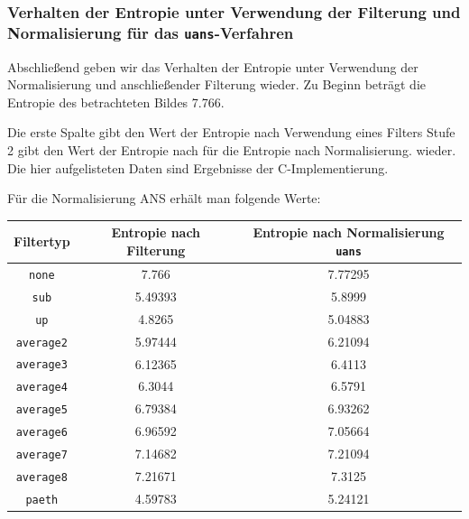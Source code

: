 \documentclass[a4paper,12pt]{article}
\newcommand{\CC}{C\nolinebreak\hspace{-.05em}\raisebox{.4ex}{\tiny\bf+}\nolinebreak\hspace{-.10em}\raisebox{.4ex}{\tiny\bf+}\;}
\begin{document}
\subsubsection{Verhalten der Entropie unter Verwendung der Filterung und Normalisierung für das {\tt{uans}}-Verfahren}
Abschließend geben wir das Verhalten der Entropie unter Verwendung der Normalisierung und anschließender Filterung wieder. Zu Beginn beträgt die Entropie des betrachteten Bildes 7.766.


 Die erste Spalte gibt den Wert der Entropie nach Verwendung eines Filters  Stufe 2  gibt den Wert der Entropie nach für die Entropie nach Normalisierung. wieder. Die hier aufgelisteten Daten sind Ergebnisse der \CC -Implementierung. 
\par
Für die Normalisierung ANS erhält man folgende Werte:
\par
\vspace{1cm}
\begin{tabular}{c | c | c }
Filtertyp & Entropie nach Filterung & Entropie nach Normalisierung {\tt{uans}}
\\
\hline
{\tt{none}} &  7.766 & 7.77295
\\
{\tt{sub}} & 5.49393 &   5.8999
\\
{\tt{up}} & 4.8265 &  5.04883
\\
{\tt{average2}} & 5.97444 &  6.21094
\\
{\tt{average3}} & 6.12365&  6.4113 
\\
{\tt{average4}} & 6.3044 &  6.5791
\\
{\tt{average5}} & 6.79384&  6.93262
\\
{\tt{average6}} & 6.96592 &  7.05664
\\
{\tt{average7}} & 7.14682 &  7.21094
\\
{\tt{average8}}& 7.21671 &  7.3125%
\\
{\tt{paeth}} & 4.59783 &  5.24121
\end{tabular}
\par
\vspace{1cm}
\end{document}
